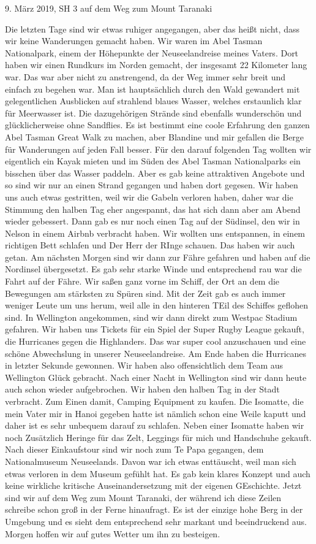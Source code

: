 \documentclass[11pt]{book}
\begin{document}
9. März 2019, SH 3 auf dem Weg zum Mount Taranaki

Die letzten Tage sind wir etwas ruhiger angegangen, aber das heißt nicht, dass wir keine Wanderungen gemacht haben. Wir waren 
im Abel Tasman Nationalpark, einem der Höhepunkte der Neuseelandreise meines Vaters. Dort haben wir einen Rundkurs im Norden 
gemacht, der insgesamt 22 Kilometer lang war. Das war aber nicht zu anstrengend, da der Weg immer sehr breit und einfach zu begehen 
war. Man ist hauptsächlich durch den Wald gewandert mit gelegentlichen Ausblicken auf strahlend blaues Wasser, welches erstaunlich 
klar für Meerwasser ist. Die dazugehörigen Strände sind ebenfalls wunderschön und glücklicherweise ohne Sandflies. Es ist bestimmt 
eine coole Erfahrung den ganzen Abel Tasman Great Walk zu machen, aber Blandine und mir gefallen die Berge für Wanderungen auf jeden Fall 
besser. Für den darauf folgenden Tag wollten wir eigentlich ein Kayak mieten und im Süden des Abel Tasman Nationalparks ein bisschen über das Wasser 
paddeln. Aber es gab keine attraktiven Angebote und so sind wir nur an einen Strand gegangen und haben dort gegesen. Wir haben uns 
auch etwas gestritten, weil wir die Gabeln verloren haben, daher war die Stimmung den halben Tag eher angespannt, das hat sich dann 
aber am Abend wieder gebessert. Dann gab es nur noch einen Tag auf der Südinsel, den wir in Nelson in einem Airbnb verbracht haben. 
Wir wollten uns entspannen, in einem richtigen Bett schlafen und Der Herr der RInge schauen. Das haben wir auch getan. Am nächsten 
Morgen sind wir dann zur Fähre gefahren und haben auf die Nordinsel übergesetzt. Es gab sehr starke Winde und entsprechend rau war 
die Fahrt auf der Fähre. Wir saßen ganz vorne im Schiff, der Ort an dem die Bewegungen am stärksten zu Spüren sind. Mit der Zeit 
gab es auch immer weniger Leute um uns herum, weil alle in den hinteren TEil des Schiffes geflohen sind. In Wellington angekommen, 
sind wir dann direkt zum Westpac Stadium gefahren. Wir haben uns Tickets für ein Spiel der Super Rugby League gekauft, die Hurricanes 
gegen die Highlanders. Das war super cool anzuschauen und eine schöne Abwechslung in unserer Neuseelandreise. Am Ende haben die Hurricanes 
in letzter Sekunde gewonnen. Wir haben also offensichtlich dem Team aus Wellington Glück gebracht. Nach einer Nacht in Wellington 
sind wir dann heute auch schon wieder aufgebrochen. Wir haben den halben Tag in der Stadt verbracht. Zum Einen damit, Camping 
Equipment zu kaufen. Die Isomatte, die mein Vater mir in Hanoi gegeben hatte ist nämlich schon eine Weile kaputt und daher ist es 
sehr unbequem darauf zu schlafen. Neben einer Isomatte haben wir noch Zusätzlich Heringe für das Zelt, Leggings für mich und Handschuhe 
gekauft. Nach dieser Einkaufstour sind wir noch zum Te Papa gegangen, dem Nationalmuseum Neuseelands. Davon war ich etwas enttäuscht, 
weil man sich etwas verloren in dem Museum gefühlt hat. Es gab kein klares Konzept und auch keine wirkliche kritische Auseinandersetzung 
mit der eigenen GEschichte. Jetzt sind wir auf dem Weg zum Mount Taranaki, der während ich diese Zeilen schreibe schon groß in der 
Ferne hinaufragt. Es ist der einzige hohe Berg in der Umgebung und es sieht dem entsprechend sehr markant und beeindruckend aus. 
Morgen hoffen wir auf gutes Wetter um ihn zu besteigen.
\end{document}
